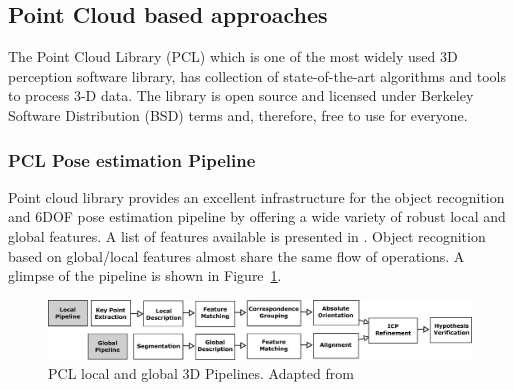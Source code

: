 \subsection{Point Cloud based approaches}
\label{ssec:pcl}
The Point Cloud Library (PCL)\cite{rusu20113d} which is one of the most widely used 3D perception software library, has collection of state-of-the-art algorithms and tools to process 3-D data. The library is open source and licensed under Berkeley Software Distribution (BSD) terms and, therefore, free to use for everyone. 
\subsubsection{PCL Pose estimation Pipeline}
	Point cloud library provides an excellent infrastructure for the object recognition and 6DOF pose estimation pipeline by offering a wide variety of robust local and global features. A list of features available is presented in \cite{aldoma2012point}. Object recognition based on global/local features almost share the same flow of operations. A glimpse of the pipeline is shown in Figure~\ref{fig:pcl_pipeline}.
\begin{figure}[H]
\centering
\includegraphics[width=1\textwidth]{assets/pcl_pipeline.eps}
\caption[PCL local and global 3D Pipelines]{PCL local and global 3D Pipelines. {Adapted from \cite{aldoma2012point}}}
\label{fig:pcl_pipeline}
\end{figure}
